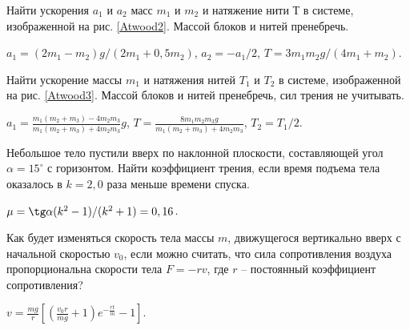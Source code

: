 \begin{ex} %
Найти ускорения $a_1$ и $a_2$ масс $m_1$ и $m_2$ и натяжение нити $Т$ в системе, изображенной на рис. \ref{Atwood2}. Массой блоков и нитей пренебречь.
\begin{ans}
$a_1 = (2m_1-m_2)g/(2m_1+0,5m_2)$, $a_2 = -a_1/2$, $T=3m_1 m_2g/(4m_1 + m_2)$.
\end{ans}
\end{ex}

\begin{ex} %
Найти ускорение массы $m_1$ и натяжения нитей $T_1$ и $T_2$ в системе, изображенной на рис. \ref{Atwood3}. Массой блоков и нитей пренебречь, сил трения не учитывать.
\begin{ans}
$a_1 = \frac{m_1(m_2+m_3)-4m_2m_3}{m_1(m_2+m_3)+4m_2m_3}g$, $T= \frac{8m_1m_2m_3g}{m_1(m_2+m_3)+4m_2m_3}$, $T_2 = T_1/2$.
\end{ans}
\end{ex}

\begin{ex} %
Небольшое тело пустили вверх по наклонной плоскости, составляющей угол $\alpha  = 15^{\circ}$ с горизонтом. Найти коэффициент трения, если время подъема тела оказалось в $k = 2,0$ раза меньше времени спуска.
\begin{ans}
$\mu = \tg \alpha (k^2-1)/(k^2+1) = 0,16$.
\end{ans}
\end{ex}

\begin{ex} %
Как будет изменяться скорость тела массы $m$, движущегося вертикально вверх с начальной скоростью $v_0$, если можно считать, что сила сопротивления воздуха пропорциональна скорости тела $F = -rv$, где $r$ -- постоянный коэффициент сопротивления?
\begin{ans}
$v = \frac{mg}{r}\left[ \left( \frac{v_0r}{mg} +1 \right)e^{-\frac{rt}{m}} - 1 \right]$.
\end{ans}
\end{ex}

\clearpage